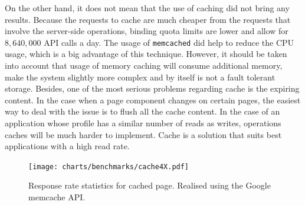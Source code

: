 
 On the other hand, it does not mean that the use of caching did not bring any results. Because the requests to cache are much cheaper from the requests that involve the server-side operations, binding quota limits are lower and allow for $8,640,000$ API calls a day. The usage of \texttt{memcached} did help to reduce the CPU usage, which is a big advantage of this technique. However, it should be taken into account that usage of memory caching will consume additional memory, make the system slightly more complex and by itself is not a fault tolerant storage. Besides, one of the most serious problems regarding cache is the expiring content. In the case when a page component changes on certain pages, the easiest way to deal with the issue is to flush all the cache content. In the case of an application whose profile has a similar number of reads as writes, operations caches will be much harder to implement. Cache is a solution that suits best applications with a high read rate.     
\begin{figure}[ht]
  \begin{center}
              \texttt{[image: charts/benchmarks/cache4X.pdf]}
  \end{center}
  \caption{Response rate statistics for cached page. Realised using the Google memcache API.}
  \label{fig:sm_benchmark_cache}
\end{figure}
 
